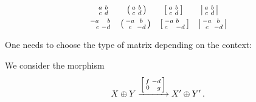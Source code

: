 \documentclass[a4paper, 10pt, abstract=on, headings=standardclasses]{scrartcl}
\begin{document}
\begin{LTXexample}[pos = r]
  \begin{gather*}
    \begin{smallmatrix}
      a & b \\
      c & d
    \end{smallmatrix}
    \qquad
    \begin{psmallmatrix}
      a & b \\
      c & d
    \end{psmallmatrix}
    \qquad
    \begin{bsmallmatrix}
      a & b \\
      c & d
    \end{bsmallmatrix}
    \qquad
    \begin{vsmallmatrix}
      a & b \\
      c & d
    \end{vsmallmatrix}
  \\
    \begin{smallmatrix*}[r]
      -a &  b \\
        c & -d
    \end{smallmatrix*}
    \quad
    \begin{psmallmatrix*}[c]
      -a &  b \\
        c & -d
    \end{psmallmatrix*}
    \quad
    \begin{bsmallmatrix*}[l]
      -a &  b \\
        c & -d
    \end{bsmallmatrix*}
    \quad
    \begin{vsmallmatrix}
      -a &  b \\
        c & -d
    \end{vsmallmatrix}
  \end{gather*}
\end{LTXexample}
One needs to choose the type of matrix depending on the context:
\begin{LTXexample}[pos = r]
  We consider the morphism
  \[
    X \oplus Y
    \xrightarrow{
      \begin{bsmallmatrix*}[r]
        f & -d \\
        0 &  g
      \end{bsmallmatrix*}
    }
    X' \oplus Y' \,.
  \]

\end{LTXexample}






\printbibliography
\end{document}
